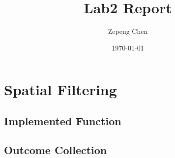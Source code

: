 \documentclass[14pt]{article}
\title{Lab2 Report}
\author{Zepeng Chen}
\date{\today}
\begin{document}
	\maketitle
	\tableofcontents
	\section{Spatial Filtering}
	\subsection{Implemented Function}
	
	\newcommand{\RNum}[1]{\uppercase\expandafter{\romannumeral #1\relax}}
	\subsection{Outcome Collection \RNum{1}}
	\newpage
\end{document}
